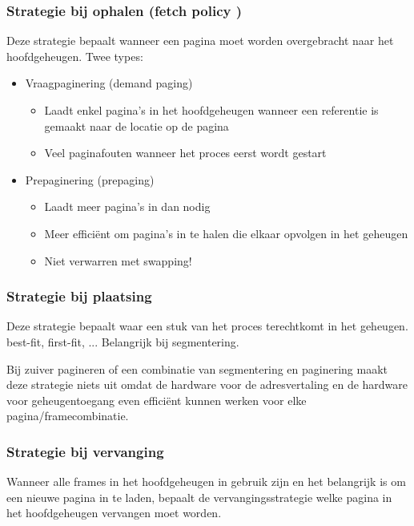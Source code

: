 \subsubsection{Strategie bij ophalen (fetch policy )}

Deze strategie bepaalt wanneer een pagina moet worden overgebracht naar het hoofdgeheugen. Twee types:

\begin{itemize}
    \item Vraagpaginering (demand paging)
        \begin{itemize}
        \item Laadt enkel pagina’s in het hoofdgeheugen wanneer een referentie is gemaakt naar de locatie op de pagina
        \item Veel paginafouten wanneer het proces eerst wordt gestart
        \end{itemize}
    \item Prepaginering (prepaging)
    \begin{itemize}
        \item Laadt meer pagina’s in dan nodig
        \item Meer efficiënt om pagina’s in te halen die elkaar opvolgen in het geheugen
        \item Niet verwarren met swapping!
        \end{itemize}

\end{itemize}


\subsubsection{Strategie bij plaatsing}

Deze strategie bepaalt waar een stuk van het proces terechtkomt in het geheugen. best-fit, first-fit, ... Belangrijk bij segmentering.

Bij zuiver pagineren of een combinatie van segmentering en paginering maakt deze strategie niets uit omdat de hardware voor de adresvertaling en de hardware voor geheugentoegang even efficiënt kunnen werken voor elke pagina/framecombinatie.


\subsubsection{Strategie bij vervanging}

Wanneer alle frames in het hoofdgeheugen in gebruik zijn en het belangrijk is om een nieuwe pagina in te laden, bepaalt de vervangingsstrategie welke pagina in het hoofdgeheugen vervangen moet worden.

